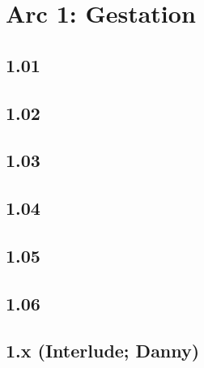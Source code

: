 \part{Arc 1: Gestation}
\chapter{1.01}


\chapter{1.02}


\chapter{1.03}


\chapter{1.04}


\chapter{1.05}


\chapter{1.06}


\chapter{1.x (Interlude; Danny)}

